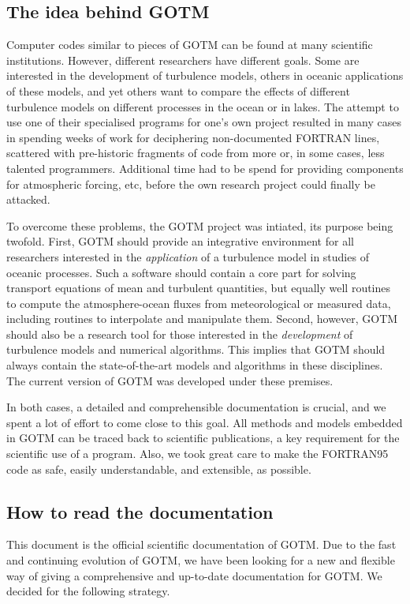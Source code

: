 \subsection{The idea behind GOTM}
Computer codes similar to pieces of GOTM can be found at many
scientific institutions. However, different researchers have different
goals. Some are interested in the development of turbulence models,
others in oceanic applications of these models, and yet others want to
compare the effects of different turbulence models on different
processes in the ocean or in lakes. The attempt to use one of their
specialised programs for one's own project resulted in many cases in
spending weeks of work for deciphering non-documented FORTRAN lines,
scattered with pre-historic fragments of code from more or, in some
cases, less talented programmers. Additional time had to be spend for
providing components for atmospheric forcing, etc, before the own
research project could finally be attacked.

To overcome these problems, the GOTM project was intiated, its
purpose being twofold. First, GOTM should provide an integrative
environment for all researchers interested in the \emph{application}
of a turbulence model in studies of oceanic processes. Such a software
should contain a core part for solving transport equations of mean and
turbulent quantities, but equally well routines to compute the
atmosphere-ocean fluxes from meteorological or measured data,
including routines to interpolate and manipulate them. Second,
however, GOTM should also be a research tool for those interested in
the \emph{development} of turbulence models and numerical
algorithms. This implies that GOTM should always contain the
state-of-the-art models and algorithms in these disciplines. The
current version of GOTM was developed under these premises.

In both cases, a detailed and comprehensible documentation is crucial,
and we spent a lot of effort to come close to this goal.  All methods
and models embedded in GOTM can be traced back to scientific
publications, a key requirement for the scientific use of a program.
Also, we took great care to make the FORTRAN95 code as safe, easily
understandable, and extensible, as possible.


\subsection{How to read the documentation}
This document is the official scientific documentation of GOTM. Due to
the fast and continuing evolution of GOTM, we have been looking for a
new and flexible way of giving a comprehensive and up-to-date
documentation for GOTM. We decided for the following strategy.

